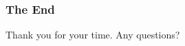 \documentclass{beamer}
\begin{document}
\begin{frame}
\frametitle{The End}
Thank you for your time.
Any questions?
\end{frame}



\end{document}
